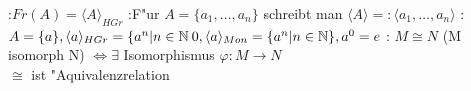\example:{$Fr(A)=\langle A \rangle _{HGr}$}
\remark:{F"ur $A=\{ a_1,\ldots,a_n\}$ schreibt man $\langle A \rangle =:\langle a_1,\ldots,a_n\rangle$}
\example:{
  $A=\{ a \}, \langle a\rangle_{HGr}=\{ a^n\vert n \in \mathbb N {\>0}, 
  \langle a \rangle_{Mon}=\{ a^n\vert n\in \mathbb N\}, a^0=e$}
\remark:{
  $M\cong N$ (M isomorph N) $\Leftrightarrow \exists$ Isomorphismus $\varphi:M\to N$ \\
  $\cong$ ist "Aquivalenzrelation}    
